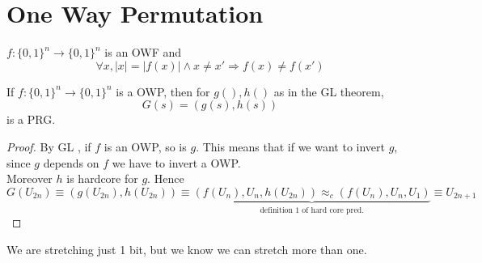 \section{One Way Permutation}
$f:{\{0,1\}^{n}} \to {\{0,1\}^{n}} $ is an OWF and 
\[
    \forall x, |x|=|f(x)| \wedge  x \not= x' \Rightarrow f(x) \not= f(x')
\]

\begin{cor}
    If $f:\{0,1\}^{n} \to \{0,1\}^{n} $ is a OWP, then for $g(), h()$ as in the
    GL theorem,
    \[
        G(s)=(g(s), h(s))
    \]
    is a PRG.
\end{cor}

\begin{proof}
    By GL , if $f$ is an OWP, so is $g$. This means that if we want to invert
    $g$, since $g$ depends on $f$ we have to invert a OWP.\\
    Moreover $h$ is hardcore for $g$.
    Hence
    \[
        G(U_{2n}) \equiv (g(U_{2n}), h(U_{2n})) \equiv \underbrace{(f(U_{n}), U_{n},
        h(U_{2n})) \approx_{c}(f(U_{n}), U_{n}, U_{1})}_{\text{definition 1 of hard core pred.}}  \equiv U_{2n+1}
    \]

\end{proof}

We are stretching just 1 bit, but we know we can stretch more than one.
\pagebreak
